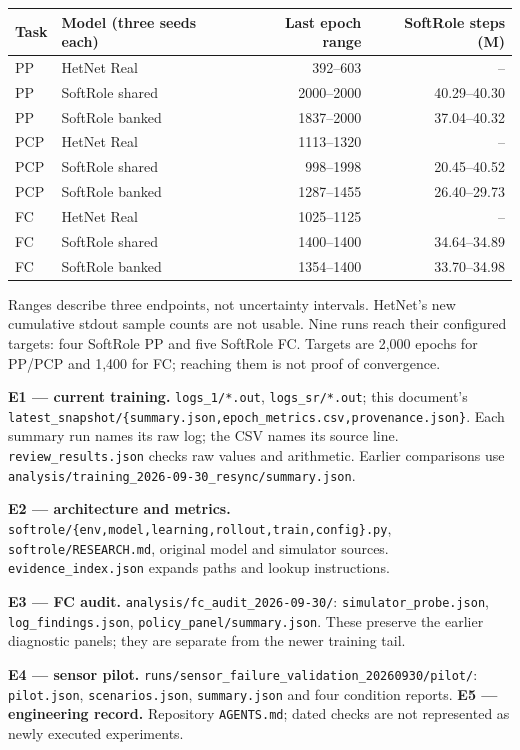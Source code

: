 \documentclass[11pt,letterpaper]{article}
\newcommand{\sub}[1]{\par\vspace{5pt}{\large\bfseries #1}\par\vspace{1pt}}
\newcommand{\captiontext}[1]{\par{\fontsize{9}{11}\selectfont\color{muted}#1\par}}
\newcommand{\code}[1]{\nolinkurl{#1}}
\begin{document}
\sub{Snapshot coverage}
{\small\renewcommand{\arraystretch}{1.05}\begin{tabularx}{\linewidth}{@{}lXrr@{}}\toprule
Task & Model (three seeds each) & Last epoch range & SoftRole steps (M) \\\midrule
PP & HetNet Real & 392--603 & -- \\
PP & SoftRole shared & 2000--2000 & 40.29--40.30 \\
PP & SoftRole banked & 1837--2000 & 37.04--40.32 \\
PCP & HetNet Real & 1113--1320 & -- \\
PCP & SoftRole shared & 998--1998 & 20.45--40.52 \\
PCP & SoftRole banked & 1287--1455 & 26.40--29.73 \\
FC & HetNet Real & 1025--1125 & -- \\
FC & SoftRole shared & 1400--1400 & 34.64--34.89 \\
FC & SoftRole banked & 1354--1400 & 33.70--34.98 \\
\bottomrule
\end{tabularx}}
\captiontext{Ranges describe three endpoints, not uncertainty intervals. HetNet's new cumulative stdout sample counts are not usable. Nine runs reach their configured targets: four SoftRole PP and five SoftRole FC. Targets are 2,000 epochs for PP/PCP and 1,400 for FC; reaching them is not proof of convergence.}

\sub{Local evidence map}
{\fontsize{9}{11}\selectfont
\textbf{E1 --- current training.} \code{logs_1/*.out}, \code{logs_sr/*.out}; this document's \code{latest_snapshot/{summary.json,epoch_metrics.csv,provenance.json}}. Each summary run names its raw log; the CSV names its source line. \code{review_results.json} checks raw values and arithmetic. Earlier comparisons use \code{analysis/training_2026-09-30_resync/summary.json}.

\textbf{E2 --- architecture and metrics.} \code{softrole/{env,model,learning,rollout,train,config}.py}, \code{softrole/RESEARCH.md}, original model and simulator sources. \code{evidence_index.json} expands paths and lookup instructions.

\textbf{E3 --- FC audit.} \code{analysis/fc_audit_2026-09-30/}: \code{simulator_probe.json}, \code{log_findings.json}, \code{policy_panel/summary.json}. These preserve the earlier diagnostic panels; they are separate from the newer training tail.

\textbf{E4 --- sensor pilot.} \code{runs/sensor_failure_validation_20260930/pilot/}: \code{pilot.json}, \code{scenarios.json}, \code{summary.json} and four condition reports. \textbf{E5 --- engineering record.} Repository \code{AGENTS.md}; dated checks are not represented as newly executed experiments.
}
\end{document}
